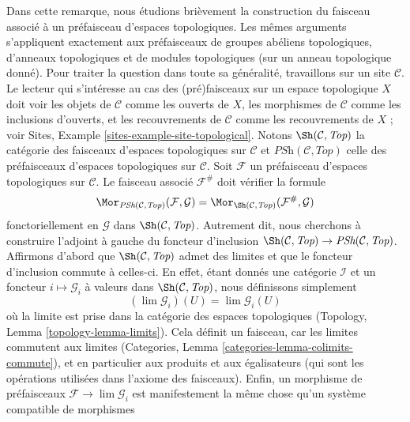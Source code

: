 \begin{remark}
\label{remark-sheafification-of-presheaves-in-top}
\begin{reference}
\cite{Gray}
\end{reference}
Dans cette remarque, nous étudions brièvement la construction du faisceau associé à un préfaisceau
d'espaces topologiques. Les mêmes arguments s'appliquent exactement aux
préfaisceaux de groupes abéliens topologiques, d'anneaux topologiques et de
modules topologiques (sur un anneau topologique donné). Pour traiter
la question dans toute sa généralité, travaillons sur un site
$\mathcal{C}$. Le lecteur qui s'intéresse au cas des (pré)faisceaux
sur un espace topologique $X$ doit voir les objets de $\mathcal{C}$
comme les ouverts de $X$, les morphismes de $\mathcal{C}$ comme les inclusions
d'ouverts, et les recouvrements de $\mathcal{C}$ comme les recouvrements de $X$ ; voir
Sites, Example \ref{sites-example-site-topological}.
Notons $\Sh(\mathcal{C}, \textit{Top})$ la catégorie des faisceaux
d'espaces topologiques sur $\mathcal{C}$ et
$\textit{PSh}(\mathcal{C}, \textit{Top})$ celle des préfaisceaux
d'espaces topologiques sur $\mathcal{C}$.
Soit $\mathcal{F}$ un préfaisceau d'espaces topologiques sur $\mathcal{C}$.
Le faisceau associé $\mathcal{F}^\#$ doit vérifier la formule
$$
\Mor_{\textit{PSh}(\mathcal{C}, \textit{Top})}(\mathcal{F}, \mathcal{G})
=
\Mor_{\Sh(\mathcal{C}, \textit{Top})}(\mathcal{F}^\#, \mathcal{G})
$$
fonctoriellement en $\mathcal{G}$ dans $\Sh(\mathcal{C}, \textit{Top})$.
Autrement dit, nous cherchons à construire l'adjoint à gauche
du foncteur d'inclusion
$\Sh(\mathcal{C}, \textit{Top}) \to \textit{PSh}(\mathcal{C}, \textit{Top})$.
Affirmons d'abord que $\Sh(\mathcal{C}, \textit{Top})$ admet des limites
et que le foncteur d'inclusion commute à celles-ci.
En effet, étant donnés une catégorie $\mathcal{I}$ et un foncteur
$i \mapsto \mathcal{G}_i$ à valeurs dans $\Sh(\mathcal{C}, \textit{Top})$,
nous définissons simplement
$$
(\lim \mathcal{G}_i)(U) = \lim \mathcal{G}_i(U)
$$
où la limite est prise dans la catégorie des espaces topologiques
(Topology, Lemma \ref{topology-lemma-limits}). Cela définit un faisceau,
car les limites commutent aux limites
(Categories, Lemma \ref{categories-lemma-colimits-commute}),
et en particulier aux produits et aux égalisateurs (qui sont les
opérations utilisées dans l'axiome des faisceaux). Enfin, un morphisme
de préfaisceaux $\mathcal{F} \to \lim \mathcal{G}_i$ est
manifestement la même chose qu'un système compatible de morphismes

\end{remark}
